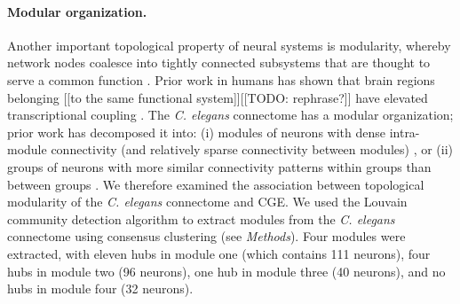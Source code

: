 \documentclass[10pt,letterpaper]{article}
\begin{document}
{\paragraph{Modular organization.}
Another important topological property of neural systems is modularity, whereby network nodes coalesce into tightly connected subsystems that are thought to serve a common function \cite{Sporns2016}.
Prior work in humans has shown that brain regions belonging [[to the same functional system]][[TODO: rephrase?]] have elevated transcriptional coupling \cite{Richiardi2015}.
The \emph{C. elegans} connectome has a modular organization; prior work has decomposed it into:
(i) modules of neurons with dense intra-module connectivity (and relatively sparse connectivity between modules) \cite{Kim2014, Pan:2010jt, Bassett2010}, or
(ii) groups of neurons with more similar connectivity patterns within groups than between groups \cite{Achacoso:1992ay, Pavlovic2014}.
We therefore examined the association between topological modularity of the \emph{C. elegans} connectome and CGE.
We used the Louvain community detection algorithm \cite{Blondel:2008do} to extract modules from the \emph{C. elegans} connectome using consensus clustering (see \textit{Methods}).
Four modules were extracted, with eleven hubs in module one (which contains 111 neurons), four hubs in module two (96 neurons), one hub in module three (40 neurons), and no hubs in module four (32 neurons).
}
\end{document}
